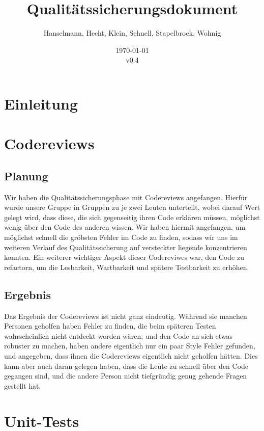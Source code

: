 \documentclass[a4paper]{scrreprt}
\begin{document}
\title{Qualitätssicherungsdokument}
\author{Hanselmann, Hecht, Klein, Schnell, Stapelbroek, Wohnig}
\date{\today\\v0.4}
\maketitle 
\tableofcontents	

\chapter{Einleitung}


\chapter{Codereviews}

\section{Planung}
Wir haben die Qualitätssicherungsphase mit Codereviews angefangen.
Hierfür wurde unsere Gruppe in Gruppen zu je zwei Leuten unterteilt, wobei
darauf Wert gelegt wird, dass diese, die sich gegenseitig ihren Code erklären
müssen, möglichst wenig über den Code des anderen wissen. Wir haben hiermit
angefangen, um möglichst schnell die gröbsten Fehler im Code zu finden, sodass
wir uns im weiteren Verlauf des Qualitätssicherung auf versteckter liegende konzentrieren
konnten. Ein weiterer wichtiger Aspekt dieser Codereviwes war, den Code zu
refactorn, um die Lesbarkeit, Wartbarkeit und spätere Testbarkeit zu erhöhen.

\section{Ergebnis}
Das Ergebnis der Codereviews ist nicht ganz eindeutig. Während sie manchen
Personen geholfen haben Fehler zu finden, die beim späteren Testen
wahrscheinlich nicht entdeckt worden wären, und den Code an sich etwas robuster
zu machen, haben andere eigentlich nur ein paar Style Fehler gefunden, und
angegeben, dass ihnen die Codereviews eigentlich nicht geholfen hätten. Dies
kann aber auch daran gelegen haben, dass die Leute zu schnell über den Code
gegangen sind, und die andere Person nicht tiefgründig genug gehende Fragen
gestellt hat.

\chapter{Unit-Tests}
\end{document}
